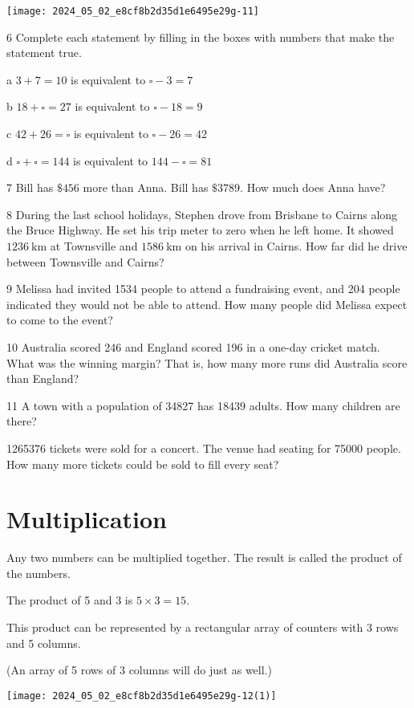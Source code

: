\documentclass[10pt]{article}
\begin{document}
\begin{center}
\texttt{[image: 2024\_05\_02\_e8cf8b2d35d1e6495e29g-11]}
\end{center}

6 Complete each statement by filling in the boxes with numbers that make the statement true.

a \(3+7=10\) is equivalent to \(\square-3=7\)

b \(18+\square=27\) is equivalent to \(\square-18=9\)

c \(42+26=\square\) is equivalent to \(\square-26=42\)

d \(\square+\square=144\) is equivalent to \(144-\square=81\)

7 Bill has \(\$ 456\) more than Anna. Bill has \(\$ 3789\). How much does Anna have?

8 During the last school holidays, Stephen drove from Brisbane to Cairns along the Bruce Highway. He set his trip meter to zero when he left home. It showed \(1236 \mathrm{~km}\) at Townsville and \(1586 \mathrm{~km}\) on his arrival in Cairns. How far did he drive between Townsville and Cairns?

9 Melissa had invited 1534 people to attend a fundraising event, and 204 people indicated they would not be able to attend. How many people did Melissa expect to come to the event?

10 Australia scored 246 and England scored 196 in a one-day cricket match. What was the winning margin? That is, how many more runs did Australia score than England?

11 A town with a population of 34827 has 18439 adults. How many children are there?

1265376 tickets were sold for a concert. The venue had seating for 75000 people. How many more tickets could be sold to fill every seat?

\section*{Multiplication}
Any two numbers can be multiplied together. The result is called the product of the numbers.

The product of 5 and 3 is \(5 \times 3=15\).

This product can be represented by a rectangular array of counters with 3 rows and 5 columns.

(An array of 5 rows of 3 columns will do just as well.)

\begin{center}
\texttt{[image: 2024\_05\_02\_e8cf8b2d35d1e6495e29g-12(1)]}
\end{center}
\end{document}
